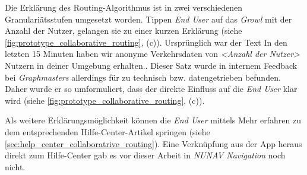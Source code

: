 Die Erklärung des Routing-Algorithmus ist in zwei verschiedenen Granulariätsstufen umgesetzt worden. Tippen \textit{End User} auf das \textit{Growl} mit der Anzahl der Nutzer, gelangen sie zu einer kurzen Erklärung (siehe \autoref{fig:prototype_collaborative_routing}, (c)). Ursprünglich war der Text \glqq In den letzten 15 Minuten haben wir anonyme Verkehrsdaten von \textit{<Anzahl der Nutzer>} Nutzern in deiner Umgebung erhalten.\grqq{}. Dieser Satz wurde in internem Feedback bei \textit{Graphmasters} allerdings für zu technisch bzw. datengetrieben befunden. Daher wurde er so umformuliert, dass der direkte Einfluss auf die \textit{End User} klar wird (siehe \autoref{fig:prototype_collaborative_routing}, (c)).

Als weitere Erklärungsmöglichkeit können die \textit{End User} mittels \glqq Mehr erfahren\grqq{} zu dem entsprechenden Hilfe-Center-Artikel springen (siehe \autoref{sec:help_center_collaboratrive_routing}). Eine Verknüpfung aus der App heraus direkt zum Hilfe-Center gab es vor dieser Arbeit in \textit{NUNAV Navigation} noch nicht.

